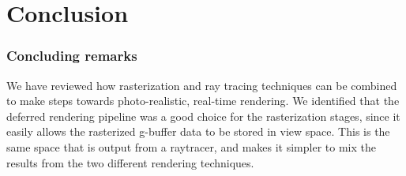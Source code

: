 \part{Conclusion}

\section{Concluding remarks}
We have reviewed how rasterization and ray tracing techniques can be combined to make steps towards photo-realistic, real-time rendering. We identified that the deferred rendering pipeline was a good choice for the rasterization stages, since it easily allows the rasterized g-buffer data to be stored in view space. This is the same space that is output from a raytracer, and makes it simpler to mix the results from the two different rendering techniques.

